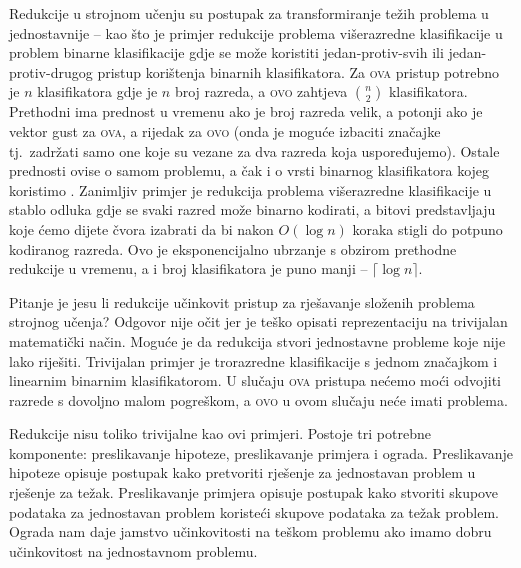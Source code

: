Redukcije u strojnom učenju su postupak za transformiranje težih problema u
jednostavnije -- kao što je primjer redukcije problema višerazredne
klasifikacije u problem binarne klasifikacije gdje se može koristiti
jedan-protiv-svih  ili
jedan-protiv-drugog  pristup
korištenja binarnih klasifikatora. Za \textsc{ova} pristup potrebno je $n$
klasifikatora gdje je $n$ broj razreda, a \textsc{ovo} zahtjeva $\binom{n}{2}$
klasifikatora. Prethodni ima prednost u vremenu ako je broj razreda velik, a
potonji ako je vektor gust za \textsc{ova}, a rijedak za \textsc{ovo} (onda je
moguće izbaciti značajke tj.~zadržati samo one koje su vezane za dva razreda
koja uspoređujemo). Ostale prednosti ovise o samom problemu, a čak i o vrsti
binarnog klasifikatora kojeg koristimo \citep{milgram2006one}. Zanimljiv primjer
je redukcija problema višerazredne klasifikacije u stablo odluka  gdje se svaki razred može binarno kodirati, a bitovi predstavljaju koje
ćemo dijete čvora izabrati da bi nakon $O(\log n)$ koraka stigli do potpuno
kodiranog razreda. Ovo je eksponencijalno ubrzanje s obzirom prethodne redukcije
u vremenu, a i broj klasifikatora je puno manji -- $\lceil \log n \rceil$.

Pitanje je jesu li redukcije učinkovit pristup za rješavanje složenih problema
strojnog učenja? Odgovor nije očit jer je teško opisati reprezentaciju na
trivijalan matematički način. Moguće je da redukcija stvori jednostavne probleme
koje nije lako riješiti. Trivijalan primjer je trorazredne klasifikacije s
jednom značajkom i linearnim binarnim klasifikatorom. U slučaju \textsc{ova}
pristupa nećemo moći odvojiti razrede s dovoljno malom pogreškom, a \textsc{ovo}
u ovom slučaju neće imati problema.

Redukcije nisu toliko trivijalne kao ovi primjeri. Postoje tri potrebne
komponente: preslikavanje hipoteze, preslikavanje primjera i ograda.
Preslikavanje hipoteze opisuje postupak kako pretvoriti rješenje za jednostavan
problem u rješenje za težak. Preslikavanje primjera opisuje postupak kako
stvoriti skupove podataka za jednostavan problem koristeći skupove podataka za
težak problem. Ograda nam daje jamstvo učinkovitosti na teškom problemu ako
imamo dobru učinkovitost na jednostavnom problemu.

